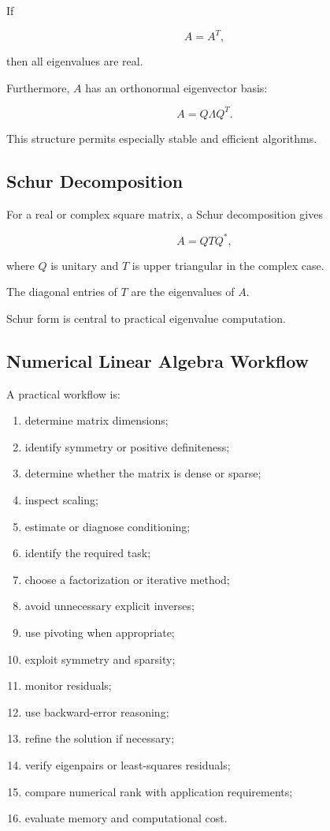 If

\[
A=A^T,
\]

then all eigenvalues are real.

Furthermore, \(A\) has an orthonormal eigenvector basis:

\[
\boxed{
A
=
Q\Lambda Q^T.
}
\]

This structure permits especially stable and efficient algorithms.

\subsection{Schur Decomposition}
\label{subsec:schur-decomposition}

For a real or complex square matrix, a Schur decomposition gives

\[
\boxed{
A
=
QTQ^*,
}
\]

where \(Q\) is unitary and \(T\) is upper triangular in the complex case.

The diagonal entries of \(T\) are the eigenvalues of \(A\).

Schur form is central to practical eigenvalue computation.

\subsection{Numerical Linear Algebra Workflow}
\label{subsec:nla-workflow}

A practical workflow is:

\begin{enumerate}
    \item determine matrix dimensions;
    \item identify symmetry or positive definiteness;
    \item determine whether the matrix is dense or sparse;
    \item inspect scaling;
    \item estimate or diagnose conditioning;
    \item identify the required task;
    \item choose a factorization or iterative method;
    \item avoid unnecessary explicit inverses;
    \item use pivoting when appropriate;
    \item exploit symmetry and sparsity;
    \item monitor residuals;
    \item use backward-error reasoning;
    \item refine the solution if necessary;
    \item verify eigenpairs or least-squares residuals;
    \item compare numerical rank with application requirements;
    \item evaluate memory and computational cost.
\end{enumerate}

